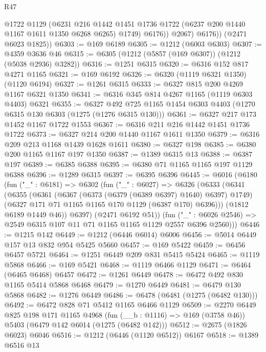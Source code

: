 \begin{lexlean}{R47}
\begin{coremodule}
                @1722
                @1129
                (@6231
                  @216
                  @1442
                  @1451
                  @1736
                  @1722
                  (@6237 @200 @1440 @1167 @1611 @1350 @6268 @6265)
                  @1749)
                @6176))
            @2067)
          @6176))
      (@2471 @6023 @1825))
@6303 := @169 @6189
@6305 := @1212 (@6003 @6303)
@6307 := @4359 @3636 @46
@6315 := @6305 (@1212 (@5857 (@169 @6307)) (@1212 (@5038 @2936) @3282))
@6316 := @1251 @6315
@6320 := @6316 @152 @817 @4271 @1165
@6321 := @169 @6192
@6326 := @6320 (@1119 @6321 @1350) (@1120 @6194)
@6327 := @1261 @6315
@6333 := @6327 @815 @200 @4269 @1167 @6321 @1350
@6341 := @6316 @345 @814 @4267 @1165 (@1119 @6303 @4403) @6321
@6355 := @6327 @492 @725 @1165 @1454 @6303 @4403 (@1270 @6315 @130 @6303 (@1275 (@1276 @6315 @130)))
@6361 := @6327 @217 @173 @1452 @1167 @1722 @1553
@6367 := @6316 @211 @216 @1442 @1451 @1736 @1722
@6373 := @6327 @214 @200 @1440 @1167 @1611 @1350
@6379 := @6316 @209 @213 @1168 @1439 @1628 @1611
@6380 := @6327 @198
@6385 := @6380 @200 @1165 @1167 @197 @1350
@6387 := @1389 @6315 @13
@6388 := @6387 @197
@6389 := @6385 @6388
@6395 := @6380 @71 @1165 @1165 @197 @1129 @6388
@6396 := @1289 @6315
@6397 := @6395 @6396
@6445 := @6016
    (@6180
      (fun ("_" : @6181) =>
      @6302
        (fun ("_" : @6027) =>
        @6326
          (@6333
            (@6341
              (@6355
                (@6361
                  (@6367 (@6373 (@6379 (@6389 @6397) @1640) @6397) @1749)
                  (@6327 @171 @71 @1165 @1165 @170 @1129 (@6387 @170) @6396)))
              (@1812 @6189 @1449 @46))
            @6397)
          (@2471 @6192 @51))
        (fun ("_" : @6026 @2546) => @2549 @6315 @107 @11 @71 @1165 @1165 @1129 @2557 @6396 @2560)))
@6446 := @1215 @142
@6449 := @1212 (@6446 @6014) @6006
@6456 := @5014 @6449 @157 @13 @832 @954 @5425 @5660
@6457 := @169 @5422
@6459 := @6456 @6457 @5721
@6464 := @1251 @6449 @209 @831 @5415 @5424
@6465 := @1119 @5868
@6466 := @169 @5421
@6468 := @1119 @6466 @1129
@6471 := @6464 (@6465 @6468) @6457
@6472 := @1261 @6449
@6478 := @6472 @492 @830 @1165 @5414 @5868 @6468
@6479 := @1270 @6449
@6481 := @6479 @130 @5868
@6482 := @1276 @6449
@6486 := @6478 (@6481 (@1275 (@6482 @130)))
@6492 := @6472 @828 @71 @5412 @1165 @6466 @1129
@6509 := @2270
    @6449
    @825
    @198
    @171
    @1165
    @4968
    (fun (__b : @1116) => @169 (@3758 @46))
    @5403
    (@6479 @142 @6014 (@1275 (@6482 @142)))
@6512 := @2675 (@1826 @6023) @6046
@6516 := @1212 (@6446 (@1120 @6512)) @6167
@6518 := @1389 @6516 @13

\end{coremodule}
\end{lexlean}
